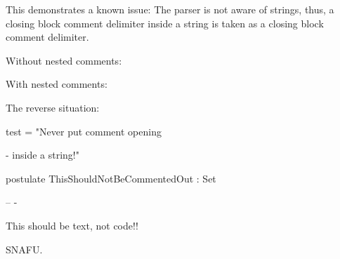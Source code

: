 
This demonstrates a known issue:
The parser is not aware of strings, thus,
a closing block comment delimiter inside a string
is taken as a closing block comment delimiter.

Without nested comments:


\begin{code}
 and other garbage @#$%
-}
\end{code}

With nested comments:


\begin{code}
This should be still commented-out. -}
\end{code}

The reverse situation:

\begin{code}
test = "Never put comment opening {- inside a string!"

postulate
  ThisShouldNotBeCommentedOut : Set

-- -} This should be text, not code!!
\end{code}

SNAFU.

